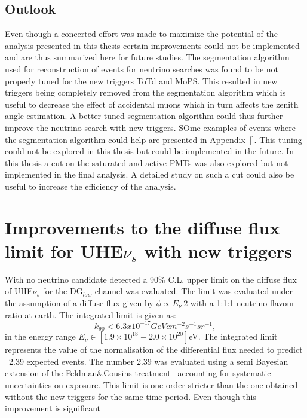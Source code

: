 \subsection*{Outlook}
Even though a concerted effort was made to maximize the potential of the analysis presented in this thesis certain improvements could not be implemented and are thus summarized here for future studies. The segmentation algorithm used for reconstruction of events for neutrino searches was found to be not properly tuned for the new triggers ToTd and MoPS. This resulted in new triggers being completely removed from the segmentation algorithm which is useful to decrease the effect of accidental muons which in turn affects the zenith angle estimation. A better tuned segmentation algorithm could thus further improve the neutrino search with new triggers. SOme examples of events where the segmentation algorithm could help are presented in Appendix~\ref{}. This tuning could not be explored in this thesis but could be implemented in the future. In this thesis a cut on the saturated and active PMTs was also explored but not implemented in the final analysis. A detailed study on such a cut could also be useful to increase the efficiency of the analysis. 

\section*{Improvements to the diffuse flux limit for UHE$\nu_s$ with new triggers}
With no neutrino candidate detected a 90\% C.L. upper limit on the diffuse flux of UHE$\nu_s$ for the DG$_{low}$ channel was evaluated. The limit was evaluated under the assumption of a diffuse flux given by $\phi \propto E_{\nu}^-2$ with a 1:1:1 neutrino flavour ratio at earth. The integrated limit is given as:
\begin{equation}
    k_{90} < 6.3 x 10^{-17} GeV cm^{-2} s^{-1} sr^{-1},
\end{equation}
in the energy range $E_{\nu} \in [1.9 \times 10^{18} - 2.0 \times 10^{20}]$eV. The integrated limit represents the value of the normalisation of the differential flux needed to predict ~2.39 expected events. The number 2.39 was evaluated using a semi Bayesian extension of the Feldman\&Cousins treatment~\cite{} accounting for systematic uncertainties on exposure. This limit is one order stricter than the one obtained without the new triggers for the same time period. Even though this improvement is significant 
